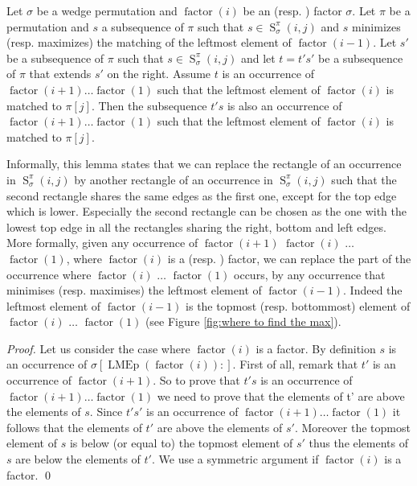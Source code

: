 \documentclass[a4paper]{llncs}
\newcommand{\RLMin}{\text{RLMin}}
\newcommand{\RLMax}{\text{RLMax}}
\newcommand{\ptext}{\pi}
\newcommand{\ppattern}{\sigma}
\DeclareMathOperator{\LMEi}{LMEp}
\DeclareMathOperator{\factor}{factor}
\DeclareMathOperator{\SETa}{S}
\newcommand{\SET}[4]{\SETa_{{#1}}^{{#2}}({#3},{#4})}
\begin{document}
\begin{lemma}
\label{lemma:ts}
Let $\ppattern$ be a wedge permutation and
$\factor(i)$ be an \RLMin (resp. \RLMax) factor $\sigma$.
Let $\pi$ be a permutation and $s$ a subsequence of $\pi$ such that
$s \in \SET{\ppattern}{\ptext}{i}{j}$ and
$s$ minimizes (resp. maximizes) the matching of the leftmost element of $\factor(i-1)$.
Let $s'$ be a subsequence of $\pi$ such that
$s \in \SET{\ppattern}{\ptext}{i}{j}$
and let $t=t's'$ be a subsequence of $\pi$ that extends $s'$ on the right.
Assume $t$ is an occurrence of $\factor(i+1)\ldots \factor(1)$ such that the leftmost element of $\factor(i)$ is matched to $\ptext[j]$. Then the subsequence $t's$ is also an occurrence of $\factor(i+1)\ldots \factor(1)$ such that the leftmost element of $\factor(i)$ is matched to $\ptext[j]$.
\end{lemma}

Informally, this lemma states that we can replace
the rectangle of an occurrence in $\SET{\ppattern}{\ptext}{i}{j}$
by another rectangle of an occurrence in $\SET{\ppattern}{\ptext}{i}{j}$
such that the second rectangle shares the same edges as the first one,
except for the top edge which is lower.
Especially the second rectangle can be chosen as the one with
the lowest top edge in all the rectangles sharing the right, bottom
and left edges.
More formally, given any occurrence of $\factor(i+1)$ $\factor(i)$ $\ldots$ $\factor(1)$,
where $\factor(i)$ is a \RLMin (resp. \RLMax) factor,
we can replace the part of the occurrence where $\factor(i)$ $\ldots$ $\factor(1)$ occurs, by any occurrence
that minimises (resp. maximises) the leftmost element of $\factor(i-1)$. Indeed the leftmost element of $\factor(i-1)$ is the topmost (resp. bottommost) element of  $\factor(i)$ $\ldots$ $\factor(1)$ (see Figure \ref{fig:where to find the max}).

\begin{proof} %
Let us consider the case where $\factor(i)$ is a \RLMin factor.
By definition $s$ is an occurrence of $\ppattern[\LMEi(\factor(i)):]$.
First of all, remark that $t'$ is an occurrence of $\factor(i+1)$.
So to prove that $t's$ is an occurrence of $\factor(i+1)\ldots \factor(1)$ we need to prove that the elements of t' are above the elements of $s$.
Since $t's'$ is an occurrence of $\factor(i+1)\ldots \factor(1)$ it follows that the elements of $t'$ are above the elements of $s'$. Moreover the topmost element of $s$ is below (or equal to) the topmost element of $s'$ thus the elements of $s$ are below the elements of $t'$. We use a symmetric argument if $\factor(i)$ is a \RLMax factor.
\qed
\end{proof}
\end{document}

